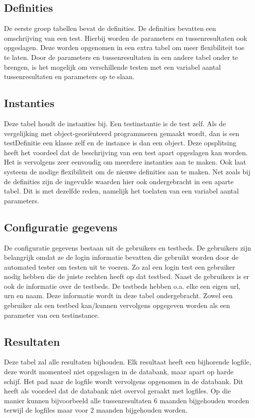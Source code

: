 \subsection{Definities}
\npar
De eerste groep tabellen bevat de definities. De definities bevatten een omschrijving van een test. Hierbij worden de parameters en tussenresultaten ook opgeslagen. Deze worden opgenomen in een extra tabel om meer flexibiliteit toe te laten. Door de parameters en tussenresultaten in een andere tabel onder te brengen, is het mogelijk om verschillende testen met een variabel aantal tussenresultaten en parameters op te slaan.
\subsection{Instanties}
\npar
Deze tabel houdt de instanties bij. Een testinstantie is de test zelf. Als de vergelijking met object-geori\"enteerd programmeren gemaakt wordt, dan is een testDefinitie een klasse zelf en de instance is dan een object. Deze opsplitsing heeft het voordeel dat de beschrijving van een test apart opgeslagen kan worden. Het is vervolgens zeer eenvoudig om meerdere instanties aan te maken. Ook laat systeem de nodige flexibiliteit om de nieuwe definities aan te maken. Net zoals bij de definities zijn de ingevulde waarden hier ook ondergebracht in een aparte tabel. Dit is met dezelfde reden, namelijk het toelaten van een variabel aantal parameters.
\subsection{Configuratie gegevens}
\npar
De configuratie gegevens bestaan uit de gebruikers en testbeds. De gebruikers zijn belangrijk omdat ze de login informatie bevatten die gebruikt worden door de automated tester om testen uit te voeren. Zo zal een login test een gebruiker nodig hebben die de juiste rechten heeft op dat testbed.
Naast de gebruikers is er ook de informatie over de testbeds. De testbeds hebben o.a. elke een eigen url, urn en naam. Deze informatie wordt in deze tabel ondergebracht. Zowel een gebruiker als een testbed kan/kunnen vervolgens opgegeven worden als een parameter van een testinstance. 
\subsection{Resultaten}
\npar
Deze tabel zal alle resultaten bijhouden. Elk resultaat heeft een bijhorende logfile, deze wordt momenteel niet opgeslagen in de databank, maar apart op harde schijf. Het pad naar de logfile wordt vervolgens opgenomen in de databank. Dit heeft als voordeel dat de databank niet overvol geraakt met logfiles. Op die manier kunnen bijvoorbeeld alle tussenresultaten 6 maanden bijgehouden worden terwijl de logfiles maar voor 2 maanden bijgehouden worden.
\clearpage
